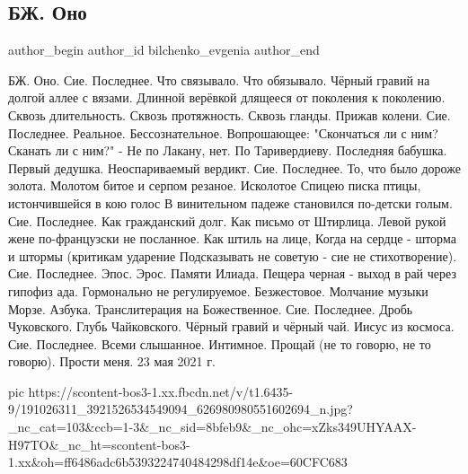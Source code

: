  
 
 
 
 
 
\subsection{БЖ. Оно}
\label{sec:24_05_2021.fb.bilchenko_evgenia.2.ono}
\ifcmt
 author_begin
   author_id bilchenko_evgenia
 author_end
\fi

БЖ. Оно. 
Сие. Последнее. Что связывало. Что обязывало.
Чёрный гравий на долгой аллее с вязами.
Длинной верёвкой длящееся от поколения к поколению.
Сквозь длительность. Сквозь протяжность. Сквозь гланды. Прижав колени.
Сие. Последнее. Реальное. Бессознательное.
Вопрошающее: "Скончаться ли с ним? Сканать ли с ним?" -
Не по Лакану, нет. По Таривердиеву.
Последняя бабушка. Первый дедушка. Неоспариваемый вердикт.
Сие. Последнее. То, что было дороже золота.
Молотом битое и серпом резаное. Исколотое
Спицею писка птицы, истончившейся в кою голос
В винительном падеже становился по-детски голым.
Сие. Последнее. Как гражданский долг. Как письмо от Штирлица.
Левой рукой жене по-французски не посланное. Как штиль на лице,
Когда на сердце - шторма и штормы (критикам ударение
Подсказывать не советую - сие не стихотворение).
Сие. Последнее. Эпос. Эрос. Памяти Илиада.
Пещера черная - выход в рай через гипофиз ада.
Гормонально не регулируемое. Безжестовое.
Молчание музыки Морзе. Азбука. Транслитерация на Божественное.
Сие. Последнее. Дробь Чуковского. Глубь
Чайковского.
Чёрный гравий и чёрный чай. Иисус из космоса. 
Сие. Последнее. Всеми слышанное. Интимное.
Прощай (не то говорю, не то говорю). Прости меня.
23 мая 2021 г.

\ifcmt
  pic https://scontent-bos3-1.xx.fbcdn.net/v/t1.6435-9/191026311_3921526534549094_626980980551602694_n.jpg?_nc_cat=103&ccb=1-3&_nc_sid=8bfeb9&_nc_ohc=xZks349UHYAAX-H97TO&_nc_ht=scontent-bos3-1.xx&oh=ff6486adc6b5393224740484298df14e&oe=60CFC683
\fi

